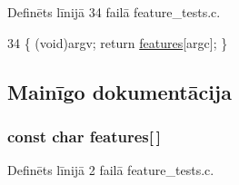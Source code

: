 Definēts līnijā 34 failā feature\+\_\+tests.\+c.


\begin{DoxyCode}
34 \{ (void)argv; \textcolor{keywordflow}{return} \hyperlink{build_2_c_make_files_2feature__tests_8c_a1582568e32f689337602a16bf8a5bff0}{features}[argc]; \}
\end{DoxyCode}


\subsection{Mainīgo dokumentācija}
\subsubsection[{\texorpdfstring{features}{features}}]{\setlength{\rightskip}{0pt plus 5cm}const char features\mbox{[}$\,$\mbox{]}}\hypertarget{cmake-build-debug_2_c_make_files_2feature__tests_8c_a1582568e32f689337602a16bf8a5bff0}{}\label{cmake-build-debug_2_c_make_files_2feature__tests_8c_a1582568e32f689337602a16bf8a5bff0}


Definēts līnijā 2 failā feature\+\_\+tests.\+c.

